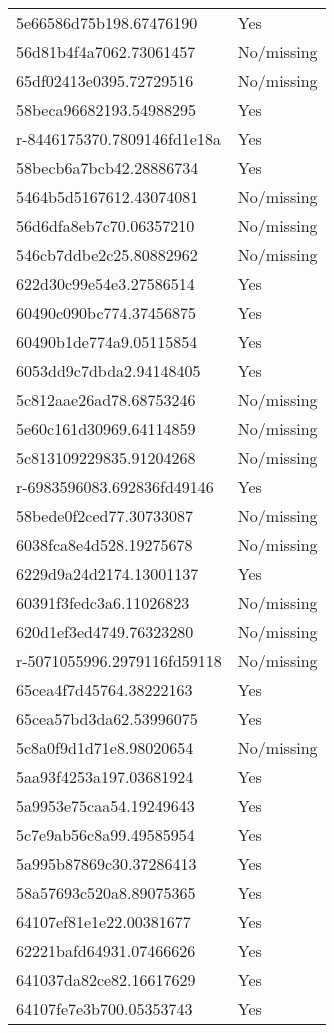 \begin{tabular}{ll}
5e66586d75b198.67476190 & Yes \\
56d81b4f4a7062.73061457 & No/missing \\
65df02413e0395.72729516 & No/missing \\
58beca96682193.54988295 & Yes \\
r-8446175370.7809146fd1e18a & Yes \\
58becb6a7bcb42.28886734 & Yes \\
5464b5d5167612.43074081 & No/missing \\
56d6dfa8eb7c70.06357210 & No/missing \\
546cb7ddbe2c25.80882962 & No/missing \\
622d30c99e54e3.27586514 & Yes \\
60490c090bc774.37456875 & Yes \\
60490b1de774a9.05115854 & Yes \\
6053dd9c7dbda2.94148405 & Yes \\
5c812aae26ad78.68753246 & No/missing \\
5e60c161d30969.64114859 & No/missing \\
5c813109229835.91204268 & No/missing \\
r-6983596083.692836fd49146 & Yes \\
58bede0f2ced77.30733087 & No/missing \\
6038fca8e4d528.19275678 & No/missing \\
6229d9a24d2174.13001137 & Yes \\
60391f3fedc3a6.11026823 & No/missing \\
620d1ef3ed4749.76323280 & No/missing \\
r-5071055996.2979116fd59118 & No/missing \\
65cea4f7d45764.38222163 & Yes \\
65cea57bd3da62.53996075 & Yes \\
5c8a0f9d1d71e8.98020654 & No/missing \\
5aa93f4253a197.03681924 & Yes \\
5a9953e75caa54.19249643 & Yes \\
5c7e9ab56c8a99.49585954 & Yes \\
5a995b87869c30.37286413 & Yes \\
58a57693c520a8.89075365 & Yes \\
64107ef81e1e22.00381677 & Yes \\
62221bafd64931.07466626 & Yes \\
641037da82ce82.16617629 & Yes \\
64107fe7e3b700.05353743 & Yes \\

\end{tabular}
